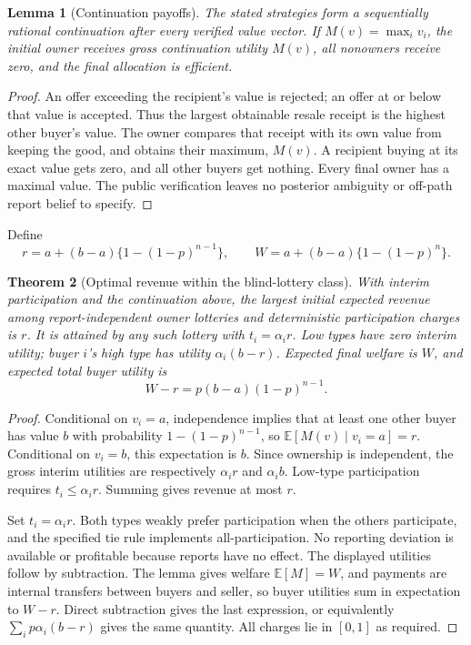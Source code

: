 \documentclass[11pt]{article}
\newtheorem{theorem}{Theorem}
\newtheorem{lemma}[theorem]{Lemma}
\theoremstyle{definition}
\theoremstyle{remark}
\begin{document}
\begin{lemma}[Continuation payoffs]
The stated strategies form a sequentially rational continuation after every verified value vector. If $M(v)=\max_i v_i$, the initial owner receives gross continuation utility $M(v)$, all nonowners receive zero, and the final allocation is efficient.
\end{lemma}
\begin{proof}
An offer exceeding the recipient's value is rejected; an offer at or below that value is accepted. Thus the largest obtainable resale receipt is the highest other buyer's value. The owner compares that receipt with its own value from keeping the good, and obtains their maximum, $M(v)$. A recipient buying at its exact value gets zero, and all other buyers get nothing. Every final owner has a maximal value. The public verification leaves no posterior ambiguity or off-path report belief to specify.
\end{proof}

Define
\[
 r=a+(b-a)\{1-(1-p)^{n-1}\},\qquad
 W=a+(b-a)\{1-(1-p)^n\}.
\]

\begin{theorem}[Optimal revenue within the blind-lottery class]
With interim participation and the continuation above, the largest initial expected revenue among report-independent owner lotteries and deterministic participation charges is $r$. It is attained by any such lottery with $t_i=\alpha_i r$. Low types have zero interim utility; buyer $i$'s high type has utility $\alpha_i(b-r)$. Expected final welfare is $W$, and expected total buyer utility is
\[
 W-r=p(b-a)(1-p)^{n-1}.
\]
\end{theorem}
\begin{proof}
Conditional on $v_i=a$, independence implies that at least one other buyer has value $b$ with probability $1-(1-p)^{n-1}$, so $\mathbb E[M(v)\mid v_i=a]=r$. Conditional on $v_i=b$, this expectation is $b$. Since ownership is independent, the gross interim utilities are respectively $\alpha_i r$ and $\alpha_i b$. Low-type participation requires $t_i\le\alpha_i r$. Summing gives revenue at most $r$.

Set $t_i=\alpha_i r$. Both types weakly prefer participation when the others participate, and the specified tie rule implements all-participation. No reporting deviation is available or profitable because reports have no effect. The displayed utilities follow by subtraction. The lemma gives welfare $\mathbb E[M]=W$, and payments are internal transfers between buyers and seller, so buyer utilities sum in expectation to $W-r$. Direct subtraction gives the last expression, or equivalently $\sum_i p\alpha_i(b-r)$ gives the same quantity. All charges lie in $[0,1]$ as required.
\end{proof}
\end{document}

